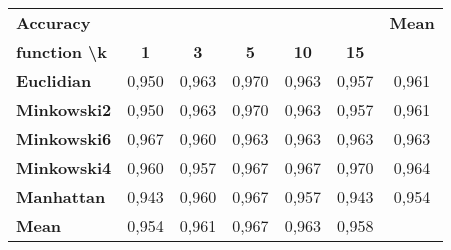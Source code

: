 \documentclass[a4paper,11pt]{report}
\begin{document}
\begin{table}[]
  \begin{center}
    \begin{tabular}{lcccccc}
      \multicolumn{6}{l}{\textbf{Accuracy}}                                                                                                                                                                                                & \multicolumn{1}{l}{\textbf{Mean}} \\ \cline{1-6}
      \multicolumn{1}{|l|}{\textbf{function \textbackslash k}} & \multicolumn{1}{c|}{\textbf{1}} & \multicolumn{1}{c|}{\textbf{3}} & \multicolumn{1}{c|}{\textbf{5}} & \multicolumn{1}{c|}{\textbf{10}} & \multicolumn{1}{c|}{\textbf{15}} & \multicolumn{1}{l}{}              \\ \hline
      \multicolumn{1}{|l|}{\textbf{Euclidian}}                 & \multicolumn{1}{c|}{0,950}      & \multicolumn{1}{c|}{0,963}      & \multicolumn{1}{c|}{0,970}      & \multicolumn{1}{c|}{0,963}       & \multicolumn{1}{c|}{0,957}       & \multicolumn{1}{c|}{0,961}        \\ \hline
      \multicolumn{1}{|l|}{\textbf{Minkowski2}}                & \multicolumn{1}{c|}{0,950}      & \multicolumn{1}{c|}{0,963}      & \multicolumn{1}{c|}{0,970}      & \multicolumn{1}{c|}{0,963}       & \multicolumn{1}{c|}{0,957}       & \multicolumn{1}{c|}{0,961}        \\ \hline
      \multicolumn{1}{|l|}{\textbf{Minkowski6}}                & \multicolumn{1}{c|}{0,967}      & \multicolumn{1}{c|}{0,960}      & \multicolumn{1}{c|}{0,963}      & \multicolumn{1}{c|}{0,963}       & \multicolumn{1}{c|}{0,963}       & \multicolumn{1}{c|}{0,963}        \\ \hline
      \multicolumn{1}{|l|}{\textbf{Minkowski4}}                & \multicolumn{1}{c|}{0,960}      & \multicolumn{1}{c|}{0,957}      & \multicolumn{1}{c|}{0,967}      & \multicolumn{1}{c|}{0,967}       & \multicolumn{1}{c|}{0,970}       & \multicolumn{1}{c|}{0,964}        \\ \hline
      \multicolumn{1}{|l|}{\textbf{Manhattan}}                 & \multicolumn{1}{c|}{0,943}      & \multicolumn{1}{c|}{0,960}      & \multicolumn{1}{c|}{0,967}      & \multicolumn{1}{c|}{0,957}       & \multicolumn{1}{c|}{0,943}       & \multicolumn{1}{c|}{0,954}        \\ \hline
      \multicolumn{1}{|l|}{\textbf{Mean}}                      & \multicolumn{1}{c|}{0,954}      & \multicolumn{1}{c|}{0,961}      & \multicolumn{1}{c|}{0,967}      & \multicolumn{1}{c|}{0,963}       & \multicolumn{1}{c|}{0,958}       &                                   \\ \cline{1-6}

\end{tabular}
\end{center}
\end{table}
\end{document}
